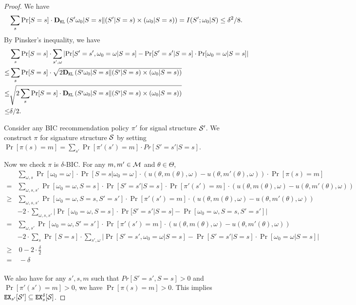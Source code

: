 \begin{proof}
We have
\[
\sum_{s} \Pr[S=s] \cdot \DKL\left(S'\omega_0|S=s \| (S'|S=s) \times (\omega_0|S=s) \right) = I(S' ; \omega_0|S) \leq \delta^2/8.
\]
By Pinsker's inequality, we have
\begin{align*}
       &\sum_{s} \Pr[S = s] \cdot  \sum_{s', \omega} \left| \Pr[S' = s', \omega_0 = \omega| S= s] - \Pr[S'=s'|S=s] \cdot \Pr[\omega_0 = \omega|S=s]\right| \\
\leq & \sum_{s} \Pr[S=s] \cdot \sqrt{2 \DKL\left(S'\omega_0|S=s \| (S'|S=s) \times (\omega_0|S=s) \right)  } \\
\leq &  \sqrt{2 \sum_{s} \Pr[S=s] \cdot  \DKL\left(S'\omega_0|S=s \| (S'|S=s) \times (\omega_0|S=s) \right) } \\
\leq &\delta /2. \\
\end{align*}

Consider any BIC recommendation policy $\pi'$ for signal structure $\S'$. We construct $\pi$ for signature structure $\S$ by setting $\Pr[\pi(s) = m] = \sum_{s'} \Pr[\pi'(s') = m] \cdot Pr[S' = s'|S = s]$.

Now we check $\pi$ is $\delta$-BIC. For any $m,m' \in \M$ and $\theta \in \varTheta$,
\begin{align*}
& \sum_{\omega,s} \Pr[\omega_0= \omega] \cdot \Pr[S = s | \omega_0 = \omega] \cdot \left(u(\theta, m(\theta), \omega) - u(\theta, m'(\theta), \omega)\right) \cdot  \Pr[\pi(s) = m] \\
=&\sum_{\omega,s,s'} \Pr[\omega_0 = \omega, S = s] \cdot \Pr[ S'=s'|S= s] \cdot \Pr[\pi'(s') = m]   \cdot \left(u(\theta, m(\theta), \omega) - u(\theta, m'(\theta), \omega)\right)\\
\geq &\sum_{\omega,s,s'} \Pr[\omega_0 = \omega, S = s, S'=s'] \cdot \Pr[\pi'(s') = m]   \cdot \left(u(\theta, m(\theta), \omega) - u(\theta, m'(\theta),
 \omega)\right)\\
& -2 \cdot \sum_{\omega,s,s'} | \Pr[\omega_0 = \omega, S = s] \cdot \Pr[ S'=s'|S= s] -  \Pr[\omega_0 = \omega, S = s, S'=s']| \\
= &\sum_{\omega,s'} \Pr[\omega_0 = \omega, S'=s'] \cdot \Pr[\pi'(s') = m]   \cdot \left(u(\theta, m(\theta), \omega) - u(\theta, m'(\theta),
 \omega)\right)\\
& -2 \cdot \sum_{s} \Pr[S = s] \cdot  \sum_{s', \omega} \left| \Pr[S' = s', \omega_0 = \omega| S= s] - \Pr[S'=s'|S=s] \cdot \Pr[\omega_0 = \omega|S=s]\right| \\
\geq&  ~0- 2 \cdot \frac{\delta}{2}\\
 =& ~-\delta\\
\end{align*}

We also have for any $s', s ,m$ such that $Pr[S' = s',S = s] >0 $ and $\Pr[\pi'(s') = m] >0$, we have $\Pr[\pi(s) = m] > 0$. This implies $\EX_{s'}[\S'] \subseteq \EX^{\delta}_s[\S]$.
\end{proof}


